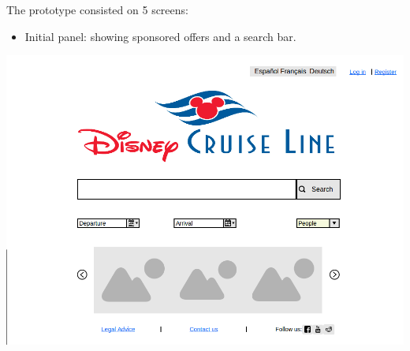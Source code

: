 \documentclass[11pt]{article}
\begin{document}
	The prototype consisted on 5 screens:
	\begin{qn}
		\begin{itemize}
			\item Initial panel: showing sponsored offers and a search bar.
		\end{itemize}
		\begin{center}
			\begin{minipage}{0.5\linewidth}
				\includegraphics[width=\linewidth]{images/mockup1.png}
				\label{fig:mockup1}
			\end{minipage}
		\end{center}
	\end{qn}
\end{document}
